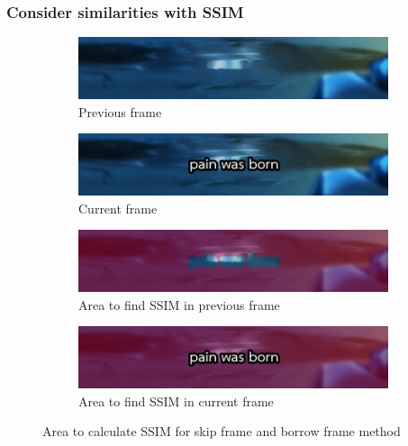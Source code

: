 \documentclass[xcolor=dvipsnames, xetex,serif]{beamer}
\begin{document}
    \begin{frame}
        \frametitle{Consider similarities with SSIM}
        \begin{figure}[H]
            \centering
            \begin{subfigure}{0.4\linewidth}
                \centering
                \includegraphics[width=0.95\linewidth]{images/skipborrow/prevframe.png}
                \caption{Previous frame}
            \end{subfigure}
            \begin{subfigure}{0.4\linewidth}
                \centering
                \includegraphics[width=0.95\linewidth]{images/skipborrow/currentframe.png}
                \caption{Current frame}
            \end{subfigure}
            \bigskip
            \begin{subfigure}{0.4\linewidth}
                \centering
                \includegraphics[width=0.95\linewidth]{images/skipborrow/prevframeinverse.png}
                \caption{Area to find SSIM in previous frame}
            \end{subfigure}
            \begin{subfigure}{0.4\linewidth}
                \centering
                \includegraphics[width=0.95\linewidth]{images/skipborrow/currentframeinverse.png}
                \caption{Area to find SSIM in current frame}
            \end{subfigure}
            \caption{Area to calculate SSIM for skip frame and borrow frame method}
        \end{figure}
    \end{frame}
\end{document}
